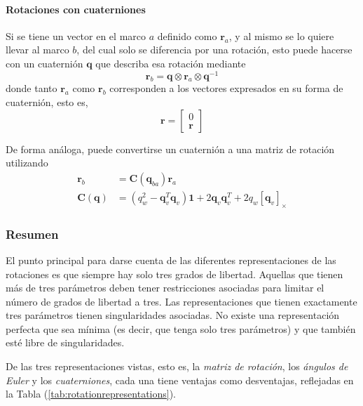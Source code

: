 \paragraph{Rotaciones con cuaterniones}
Si se tiene un vector en el marco $a$ definido como $\bm{r}_a$, y al mismo se lo quiere llevar al marco $b$, del cual solo se diferencia por una rotación, esto puede hacerse con un cuaternión $\bm{q}$ que describa esa rotación mediante
\begin{equation}
    \bm{r}_b = \bm{q}\otimes\bm{r}_a\otimes\bm{q}^{-1}
    \label{eq:quaternionvectorrotation}
\end{equation}
donde tanto $\bm{r}_a$ como $\bm{r}_b$ corresponden a los vectores expresados en su forma de cuaternión, esto es,
\begin{equation}
    \bm{r} = 
    \begin{bmatrix}
    0 \\
    \bm{r}
    \end{bmatrix}
    \label{eq:vectorquaternionform}
\end{equation}

De forma análoga, puede convertirse un cuaternión a una matriz de rotación utilizando
\begin{align}
    \bm{r}_b &= \bm{C}(\bm{q}_{ba})\bm{r}_a \\
    \bm{C}(\bm{q}) &= (q_w^2 - \bm{q}_v^T\bm{q}_v)\bm{1} + 2\bm{q}_v\bm{q}_v^T + 2q_w\left[\bm{q}_v\right]_\times
\end{align}

\subsubsection{Resumen}
El punto principal para darse cuenta de las diferentes representaciones de las rotaciones es que siempre hay solo tres grados de libertad. Aquellas que tienen más de tres parámetros deben tener restricciones asociadas para limitar el número de grados de libertad a tres. Las representaciones que tienen exactamente tres parámetros tienen singularidades asociadas. No existe una representación perfecta que sea mínima (es decir, que tenga solo tres parámetros) y que también esté libre de singularidades\cite{stuelpnagle1964}.%

De las tres representaciones vistas, esto es, la \textit{matriz de rotación}, los \textit{ángulos de Euler} y los \textit{cuaterniones}, cada una tiene ventajas como desventajas, reflejadas en la Tabla (\ref{tab:rotationrepresentations}).

